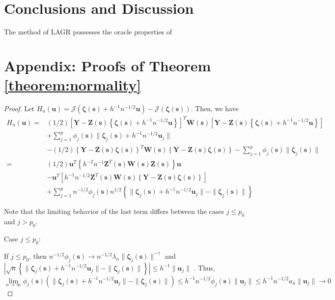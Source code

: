 \documentclass[12pt,english,authoryear, review]{article}\usepackage[]{graphicx}\usepackage[]{color}
\theoremstyle{plain}
\theoremstyle{plain}
\begin{document}
\section{Conclusions and Discussion}

The method of LAGR possesses the oracle properties of 

\appendix

\section*{Appendix: Proofs of Theorem \ref{theorem:normality}\label{sec:gaussian-normality-proof} }
\begin{proof}
Let $H_{n}(\bm{u})=\mathcal{J}\left(\bm{\zeta}\left(\bm{s}\right)+h^{-1}n^{-1/2}\bm{u}\right)-\mathcal{J}\left(\bm{\zeta}\left(\bm{s}\right)\right)$.
Then, we have 
\begin{align}
H_{n}\left(\bm{u}\right)= & (1/2)\left[\bm{Y}-\bm{Z}(\bm{s})\left\{ \bm{\zeta}\left(\bm{s}\right)+h^{-1}n^{-1/2}\bm{u}\right\} \right]^{T}\bm{W}(\bm{s})\left[\bm{Y}-\bm{Z}(\bm{s})\left\{ \bm{\zeta}\left(\bm{s}\right)+h^{-1}n^{-1/2}\bm{u}\right\} \right]\\
 & +\sum_{j=1}^{p}\phi_{j}(\bm{s})\|\bm{\zeta}_{j}(\bm{s})+h^{-1}n^{-1/2}\bm{u}_{j}\|\\
 & -(1/2)\left\{ \bm{Y}-\bm{Z}(\bm{s})\bm{\zeta}(\bm{s})\right\} ^{T}\bm{W}(\bm{s})\left\{ \bm{Y}-\bm{Z}(\bm{s})\bm{\zeta}(\bm{s})\right\} -\sum_{j=1}^{p}\phi_{j}(\bm{s})\|\bm{\zeta}_{j}(\bm{s})\|\\
= & (1/2)\bm{u}^{T}\left\{ h^{-2}n^{-1}\bm{Z}^{T}(\bm{s})\bm{W}(\bm{s})\bm{Z}(\bm{s})\right\} \bm{u}\\
 & -\bm{u}^{T}\left[h^{-1}n^{-1/2}\bm{Z}^{T}(\bm{s})\bm{W}(\bm{s})\left\{ \bm{Y}-\bm{Z}(\bm{s})\bm{\zeta}(\bm{s})\right\} \right]\\
 & +\sum_{j=1}^{p}n^{-1/2}\phi_{j}(\bm{s})n^{1/2}\left\{ \|\bm{\zeta}_{j}(\bm{s})+h^{-1}n^{-1/2}\bm{u}_{j}\|-\|\bm{\zeta}_{j}(\bm{s})\|\right\} 
\end{align}


Note that the limiting behavior of the last term differs between the
cases $j\le p_{0}$ and $j>p_{0}$.

Case $j\le p_{0}$:

If $j\le p_{0}$, then $n^{-1/2}\phi_{j}(\bm{s})\to n^{-1/2}\lambda_{n}\|\bm{\zeta}_{j}(\bm{s})\|^{-\gamma}$
and $|\sqrt{n}\left\{ \|\bm{\zeta}_{j}(\bm{s})+h^{-1}n^{-1/2}\bm{u}_{j}\|-\|\bm{\zeta}_{j}(\bm{s})\|\right\} |\le h^{-1}\|\bm{u}_{j}\|$
. Thus, 
\[
\lim\limits _{n\to\infty}\phi_{j}(\bm{s})\left(\|\bm{\zeta}_{j}(\bm{s})+h^{-1}n^{-1/2}\bm{u}_{j}\|-\|\bm{\zeta}_{j}(\bm{s})\|\right)\le h^{-1}n^{-1/2}\phi_{j}(\bm{s})\|\bm{u}_{j}\|\le h^{-1}n^{-1/2}a_{n}\|\bm{u}_{j}\|\to0
\]



\end{proof}
\end{document}
